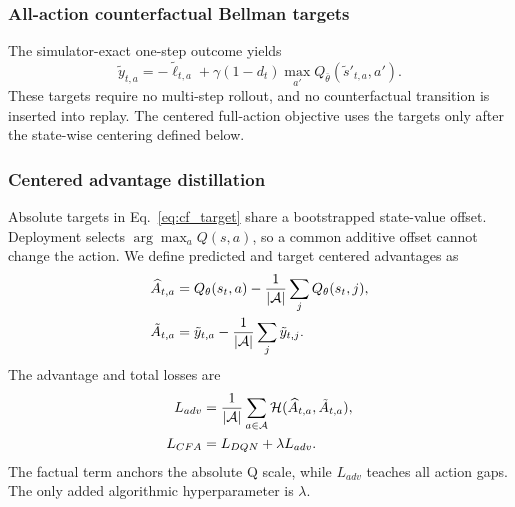 \documentclass[remotesensing,article,submit,moreauthors]{Definitions/mdpi}
\begin{document}
\subsubsection{All-action counterfactual Bellman targets}

The simulator-exact one-step outcome yields
\begin{equation}
\tilde y_{t,a}=-\tilde \ell_{t,a}+\gamma(1-d_t)
\max_{a'}Q_{\bar\theta}(\tilde s'_{t,a},a').
\label{eq:cf_target}
\end{equation}
These targets require no multi-step rollout, and no counterfactual transition is inserted into replay. The centered full-action objective uses the targets only after the state-wise centering defined below.

\subsubsection{Centered advantage distillation}

Absolute targets in Eq.~\eqref{eq:cf_target} share a bootstrapped state-value offset. Deployment selects $\arg\max_a Q(s,a)$, so a common additive offset cannot change the action. We define predicted and target centered advantages as
\begin{align}
\widehat A_{t,a}&=Q_\theta(s_t,a)-\frac{1}{|\mathcal A|}\sum_jQ_\theta(s_t,j),\notag\\
\tilde A_{t,a}&=\tilde y_{t,a}-\frac{1}{|\mathcal A|}\sum_j\tilde y_{t,j}.
\label{eq:center}
\end{align}
The advantage and total losses are
\begin{align}
L_{adv}&=\frac{1}{|\mathcal A|}
\sum_{a\in\mathcal A}\mathcal H(\widehat A_{t,a},\tilde A_{t,a}),\notag\\
L_{CFA}&=L_{DQN}+\lambda L_{adv}.
\label{eq:cbad}
\end{align}
The factual term anchors the absolute Q scale, while $L_{adv}$ teaches all action gaps. The only added algorithmic hyperparameter is $\lambda$.
\end{document}
